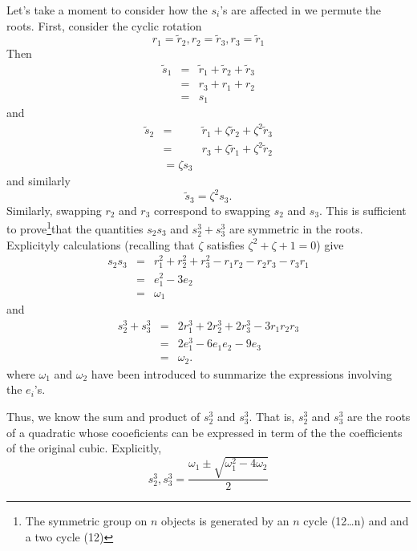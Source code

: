 \documentclass{article}
\begin{document}
Let's take a moment to consider how the $s_i$'s are affected
in we permute the roots.  First, consider the cyclic rotation
\begin{equation}
  r_1 = \tilde r_2 ,
  r_2 = \tilde r_3 ,
  r_3 = \tilde r_1 
\end{equation}
Then
\begin{eqnarray}
\tilde s_1 & = & \tilde r_1 + \tilde r_2 + \tilde r_3 \\
       & = & r_3 + r_1 + r_2 \\
       & = & s_1
\end{eqnarray}
and
\begin{eqnarray}
\tilde s_2 & = & \tilde r_1 + \zeta \tilde r_2 +
                       \zeta^2 \tilde r_3 \\
         & = & r_3 + \zeta \tilde r_1 +
                       \zeta^2 \tilde r_2 \\
         & = \zeta s_3
\end{eqnarray}
and similarly
\begin{equation}
  \tilde s_3 = \zeta^2 s_3.
\end{equation}
Similarly, swapping $r_2$ and $r_3$ correspond to 
swapping $s_2$ and $s_3$.  This is sufficient to 
prove\footnote{The symmetric group on $n$ objects
is generated by an $n$ cycle  (12\ldots n) and 
and a two cycle (12)}that the quantities $s_2 s_3$ and $s_2^3 + s_3^3$
are symmetric in the roots.
Explicityly calculations (recalling that $\zeta$ satisfies
$\zeta^2 + \zeta + 1 = 0$) give
\begin{eqnarray}
  s_2 s_3 & = & r_1^2 + r_2^2 + r_3^2 - r_1 r_2 - r_2 r_3 - r_3 r_1\\
     & = & e_1^2 - 3 e_2\\
     & = & \omega_1
\end{eqnarray}
and
\begin{eqnarray}
 s_2 ^3 + s_3^3 & = & 2 r_1^3 + 2 r_2^3 + 2 r_3^3 - 3 r_1 r_2 r_3 \\
   & = & 2 e_1^3 - 6 e_1 e_2 - 9 e_3 \\
   & = & \omega_2.
\end{eqnarray}
where $\omega_1$ and $\omega_2$ have been introduced to summarize
the expressions involving the $e_i$'s.

Thus, we know the sum and product of $s_2^3$ and $s_3^3$.  That is,
$s_2^3$ and $s_3^3$ are the roots of a quadratic whose cooeficients
can be expressed in term of the the coefficients of the original
cubic. Explicitly,
\begin{equation}
 s_2^3, s_3^3 = \frac{\omega_1 \pm \sqrt{\omega_1^2 - 4\omega_2}}{2}
\end{equation}
\end{document}
